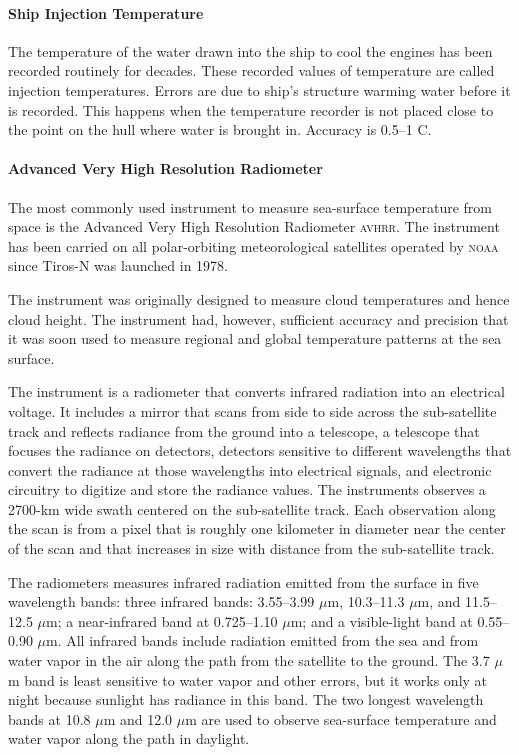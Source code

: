 \paragraph{Ship Injection Temperature} The temperature of the water drawn into
the ship to cool the engines has been recorded
routinely for decades. These recorded values of temperature are called
injection temperatures. Errors are due to ship's structure warming
water before it is recorded. This happens when the temperature
recorder is not placed close to the point on the hull where water
is brought in. Accuracy is 0.5\degrees --1\degrees
C.

\paragraph{Advanced Very High Resolution Radiometer} The most commonly
used instrument to measure sea-surface temperature from space is the Advanced
Very High Resolution Radiometer \textsc{avhrr}. The instrument has been carried on all
polar-orbiting meteorological satellites operated by \textsc{noaa}
since Tiros-N was launched in 1978.

The instrument was originally designed to measure cloud temperatures and
hence cloud height. The instrument had, however, sufficient accuracy and precision that it was soon used to measure regional and global temperature
patterns at the sea surface.

The instrument is a radiometer that converts infrared radiation into an electrical voltage. It includes a mirror that scans from side to side across the
sub-satellite track and reflects radiance from the ground into a telescope, a
telescope that focuses the radiance on detectors, detectors sensitive to
different wavelengths that convert the radiance at those wavelengths into
electrical signals, and electronic circuitry to digitize and store the radiance
values. The instruments observes a 2700-km wide swath centered on the
sub-satellite track. Each observation along the scan is from a pixel that is
roughly one kilometer in diameter near the center of the scan and that increases
in size with distance from the sub-satellite track.

The radiometers measures infrared radiation emitted from the surface in five
wavelength bands: three infrared bands: 3.55--3.99 $\mu$m, 10.3--11.3 $\mu$m, and
11.5--12.5
$\mu$m; a near-infrared band at 0.725--1.10 $\mu$m; and a visible-light band at
0.55--0.90 $\mu$m. All infrared bands include radiation emitted from the sea
and from water vapor in the air along the path from the satellite to the ground.
The 3.7 $\mu$m band is least sensitive to water vapor and other errors, but it
works only at night because sunlight has radiance in this band. The two longest
wavelength bands at 10.8 $\mu$m and 12.0 $\mu$m are used to observe sea-surface
temperature and water vapor along the path in daylight.

